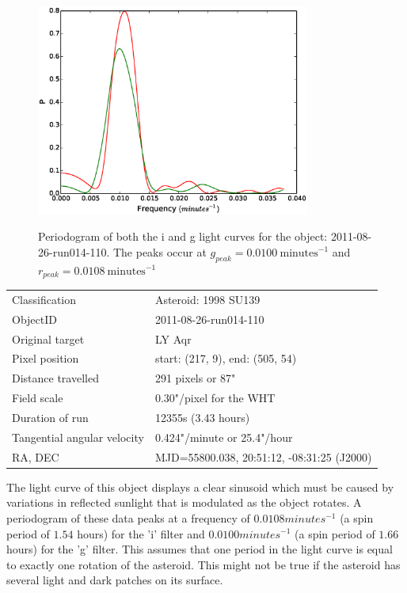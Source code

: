 \begin{figure}
  \center
  \includegraphics[width=90mm]{images/2011-08-26-run014-110-pgram-bin4.eps} 
  \label{fig:2013-07-21-run010-23}
  \caption{Periodogram of both the i and g light curves for the object: 2011-08-26-run014-110. The peaks occur at $g_{peak} = 0.0100 \ \mbox{minutes}^{-1}$ and  $r_{peak} = 0.0108\ \mbox{minutes}^{-1}$ }
\end{figure}


\begin{tabular}{l l}
  Classification & Asteroid: 1998 SU139 \\
  ObjectID & 2011-08-26-run014-110 \\
  Original target & LY Aqr \\
  Pixel position & start: (217, 9), end: (505, 54) \\
  Distance travelled & 291 pixels or 87" \\
  Field scale & 0.30"/pixel for the WHT\\
  Duration of run & 12355s (3.43 hours) \\
  Tangential angular velocity & 0.424"/minute or 25.4"/hour\\ 
  RA, DEC & MJD=55800.038, 20:51:12, -08:31:25 (J2000) \\
\end{tabular}


The light curve of this object displays a clear sinusoid which must be caused by variations in reflected sunlight that is modulated as the object rotates. A periodogram of these data peaks at a frequency of $0.0108 minutes^{-1}$ (a spin period of $1.54$ hours) for the 'i' filter and $0.0100 minutes^{-1}$ (a spin period of $1.66$ hours) for the 'g' filter. This assumes that one period in the light curve is equal to exactly one rotation of the asteroid. This might not be true if the asteroid has several light and dark patches on its surface. 

